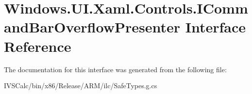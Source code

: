 \hypertarget{interface_windows_1_1_u_i_1_1_xaml_1_1_controls_1_1_i_command_bar_overflow_presenter}{}\section{Windows.\+U\+I.\+Xaml.\+Controls.\+I\+Command\+Bar\+Overflow\+Presenter Interface Reference}
\label{interface_windows_1_1_u_i_1_1_xaml_1_1_controls_1_1_i_command_bar_overflow_presenter}


The documentation for this interface was generated from the following file\+:\begin{DoxyCompactItemize}
\item 
I\+V\+S\+Calc/bin/x86/\+Release/\+A\+R\+M/ilc/Safe\+Types.\+g.\+cs\end{DoxyCompactItemize}
